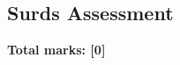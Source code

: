 \documentclass[../c1]{subfiles}
\begin{document}
\subsection*{Surds Assessment}
\thispagestyle{fancy}



\begin{flushright}
\textbf{Total marks: [0]}
\end{flushright}
\end{document}
